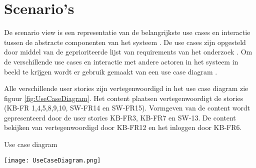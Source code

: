 \section{Scenario's}
De scenario view is een representatie van de belangrijkste use cases en interactie tussen de abstracte componenten van het systeem \parencite{4+1ViewModelPaper}.
De use cases zijn opgesteld door middel van de geprioriteerde lijst van requirements van het onderzoek \parencite{DanteOnderzoek}.
Om de verschillende use cases en interactie met andere actoren in het systeem in beeld te krijgen wordt er gebruik gemaakt van een use case diagram \parencite{UseCaseDiagram}.

\whitespace
Alle verschillende user stories zijn vertegenwoordigd in het use case diagram zie figuur \ref{fig:UseCaseDiagram}.
Het content plaatsen vertegenwoordigt de stories (KB-FR 1,4,5,8,9,10, SW-FR14 en SW-FR15).
Vormgeven van de content wordt gepresenteerd door de user stories KB-FR3, KB-FR7 en SW-13.
De content bekijken van vertegenwoordigd door KB-FR12 en het inloggen door KB-FR6.

\whitespace[2]
\begin{graphic}
	\captionsetup{type=figure}
	\caption{Use case diagram}
	\texttt{[image: UseCaseDiagram.png]}
	\label{fig:UseCaseDiagram}
\end{graphic}

